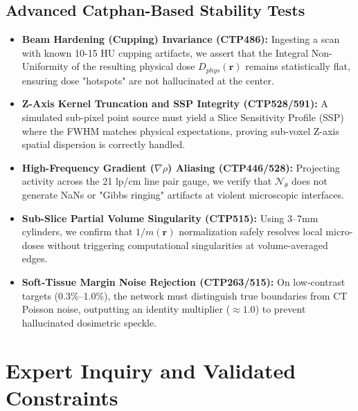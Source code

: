 \documentclass[11pt,a4paper]{article}
\begin{document}
\subsection{Advanced Catphan-Based Stability Tests}
\begin{itemize}
    \item \textbf{Beam Hardening (Cupping) Invariance (CTP486):} Ingesting a scan with known 10-15 HU cupping artifacts, we assert that the Integral Non-Uniformity of the resulting physical dose $D_{phys}(\mathbf{r})$ remains statistically flat, ensuring dose "hotspots" are not hallucinated at the center.
    \item \textbf{Z-Axis Kernel Truncation and SSP Integrity (CTP528/591):} A simulated sub-pixel point source must yield a Slice Sensitivity Profile (SSP) where the FWHM matches physical expectations, proving sub-voxel Z-axis spatial dispersion is correctly handled.
    \item \textbf{High-Frequency Gradient ($\nabla \rho$) Aliasing (CTP446/528):} Projecting activity across the 21 lp/cm line pair gauge, we verify that $\mathcal{N}_\theta$ does not generate NaNs or "Gibbs ringing" artifacts at violent microscopic interfaces.
    \item \textbf{Sub-Slice Partial Volume Singularity (CTP515):} Using 3--7mm cylinders, we confirm that $1/m(\mathbf{r})$ normalization safely resolves local micro-doses without triggering computational singularities at volume-averaged edges.
    \item \textbf{Soft-Tissue Margin Noise Rejection (CTP263/515):} On low-contrast targets (0.3\%--1.0\%), the network must distinguish true boundaries from CT Poisson noise, outputting an identity multiplier ($\approx 1.0$) to prevent hallucinated dosimetric speckle.
\end{itemize}

\section{Expert Inquiry and Validated Constraints}
\end{document}
